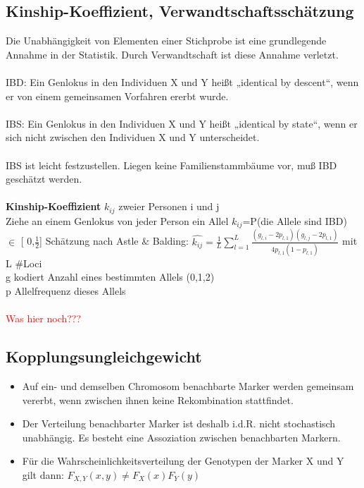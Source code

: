 \subsection{Kinship-Koeffizient, Verwandtschaftsschätzung}
Die Unabhängigkeit von Elementen einer Stichprobe ist eine grundlegende Annahme in der Statistik. Durch Verwandtschaft ist diese Annahme verletzt.\\\\
IBD: Ein Genlokus in den Individuen X und Y heißt „identical by descent“, wenn er von einem gemeinsamen Vorfahren ererbt wurde.\\\\
IBS: Ein Genlokus in den Individuen X und Y heißt „identical by state“, wenn er sich nicht zwischen den Individuen X und Y unterscheidet.\\\\
IBS ist leicht festzustellen. Liegen keine Familienstammbäume vor, muß IBD geschätzt werden.
\\\\
\textbf{Kinship-Koeffizient} $k_{ij}$ zweier Personen i und j\\
Ziehe an einem Genlokus von jeder Person ein Allel
$k_{ij}$=P(die Allele sind IBD) $\in$ [ 0,$\frac{1}{2}$]
Schätzung nach Astle \& Balding:
$\hat{k_{ij}}=\frac{1}{L} \displaystyle \sum_{l=1}^{L} \frac{(g_{l,i} - 2p_{l,1})(g_{l,j} - 2p_{l,1})}{4p_{l,1}(1-p_{l,1})}$ mit \\
L \#Loci\\
g kodiert Anzahl eines bestimmten Allels (0,1,2)\\
p Allelfrequenz dieses Allels
\\\\
\textcolor{red}{Was hier noch???}

\newpage
\subsection{Kopplungsungleichgewicht}
\begin{itemize}
	\item Auf ein- und demselben Chromosom benachbarte Marker werden gemeinsam vererbt, wenn zwischen ihnen keine Rekombination stattfindet.
	\item Der Verteilung benachbarter Marker ist deshalb i.d.R. nicht stochastisch unabhängig. Es besteht eine Assoziation zwischen benachbarten Markern.
	\item Für die Wahrscheinlichkeitsverteilung der Genotypen der Marker X und Y gilt dann: $F_{X,Y}(x,y)\neq F_{X}(x)F_{Y}(y)$
\end{itemize}

